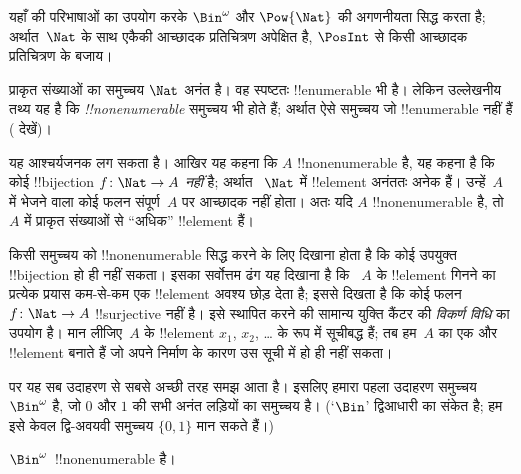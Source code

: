 \documentclass[../../../include/open-logic-section]{subfiles}
\begin{document}


\begin{editorial}
  यहाँ  की परिभाषाओं का उपयोग करके $\Bin^\omega$ और
  $\Pow{\Nat}$ की अगणनीयता सिद्ध करता है; अर्थात~$\Nat$ के साथ एकैकी
  आच्छादक प्रतिचित्रण अपेक्षित है, $\PosInt$ से किसी आच्छादक प्रतिचित्रण के बजाय।
\end{editorial}

\begin{explain}
प्राकृत संख्याओं का समुच्चय $\Nat$ अनंत है। वह स्पष्टतः !!{enumerable} भी
है। लेकिन उल्लेखनीय तथ्य यह है कि \emph{!!{nonenumerable}} समुच्चय भी होते
हैं; अर्थात ऐसे समुच्चय जो !!{enumerable} नहीं हैं
( देखें)।

यह आश्चर्यजनक लग सकता है। आखिर यह कहना कि $A$ !!{nonenumerable} है, यह कहना
है कि कोई !!{bijection} $f
\colon \Nat \to A$ \emph{नहीं} है; अर्थात
~$\Nat$ में !!{element} अनंततः अनेक हैं। उन्हें~$A$ में भेजने वाला कोई फलन संपूर्ण~$A$ पर
आच्छादक नहीं होता। अतः यदि $A$ !!{nonenumerable} है, तो~$A$ में प्राकृत
संख्याओं से ``अधिक'' !!{element} हैं।

किसी समुच्चय को !!{nonenumerable} सिद्ध करने के लिए दिखाना होता है कि कोई
उपयुक्त !!{bijection} हो ही नहीं सकता। इसका सर्वोत्तम ढंग यह दिखाना है कि
~$A$ के !!{element} गिनने का प्रत्येक प्रयास कम-से-कम एक !!{element}
अवश्य छोड़ देता है; इससे दिखता है कि कोई फलन $f\colon \Nat
\to A$ !!{surjective} नहीं है। इसे स्थापित करने की सामान्य युक्ति कैंटर की
\emph{विकर्ण विधि} का उपयोग है। मान लीजिए~$A$ के !!{element} $x_1$, $x_2$,
\dots{} के रूप में सूचीबद्ध हैं; तब हम~$A$ का एक और !!{element} बनाते हैं जो
अपने निर्माण के कारण उस सूची में हो ही नहीं सकता।

पर यह सब उदाहरण से सबसे अच्छी तरह समझ आता है। इसलिए हमारा पहला उदाहरण
समुच्चय~$\Bin^\omega$ है, जो $0$ और $1$ की सभी अनंत लड़ियों का समुच्चय है। (`$\Bin$'
द्विआधारी का संकेत है; हम इसे केवल द्वि-अवयवी समुच्चय
$\{0,1\}$ मान सकते हैं।)
\end{explain}

\begin{thm}
$\Bin^\omega$~!!{nonenumerable} है।
\end{thm}
\end{document}
